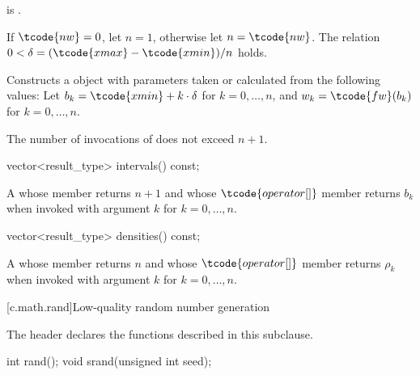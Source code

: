 \begin{itemdescr}
\pnum
\mandates
{} is .

\pnum
\expects
 If $\tcode{nw} = 0$, let $n = 1$, otherwise let $n = \tcode{nw}$.
 The relation $0 < \delta = (\tcode{xmax} - \tcode{xmin}) / n$
 holds.

\pnum
\effects
Constructs a  object
 with parameters taken or calculated
 from the following values:
 Let $b_k = \tcode{xmin} + k \cdot \delta$ for $k = 0, \dotsc, n$,
 and $w_k = \tcode{fw}(b_k)$ for $k = 0, \dotsc, n$.

\pnum
\complexity
The number of invocations of  does not exceed $n+1$.
\end{itemdescr}

%
\begin{itemdecl}
vector<result_type> intervals() const;
\end{itemdecl}

\begin{itemdescr}
\pnum
\returns
A 
 whose  member returns $n + 1$
 and whose $ \tcode{operator[]} $ member returns $b_k$
 when invoked with argument $k$ for $k = 0, \dotsc, n$.
\end{itemdescr}

%
\begin{itemdecl}
vector<result_type> densities() const;
\end{itemdecl}

\begin{itemdescr}
\pnum
\returns
A 
 whose  member returns $n$
 and whose $ \tcode{operator[]} $ member returns $\rho_k$
 when invoked with argument $k$ for $k = 0, \dotsc, n$.
\end{itemdescr}%
%
%
%
%

[c.math.rand]{Low-quality random number generation}

\pnum
\begin{note}
The header 
declares the functions described in this subclause.
\end{note}

%
%
\begin{itemdecl}
int rand();
void srand(unsigned int seed);
\end{itemdecl}

